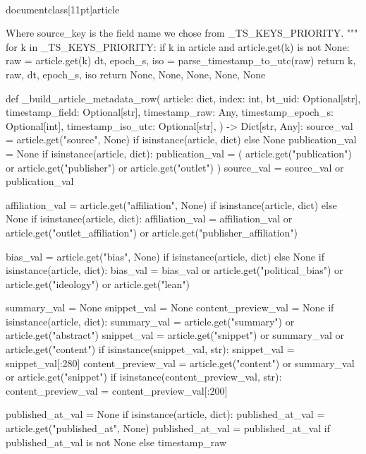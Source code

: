 \\documentclass[11pt]{article}
\begin{document}
\begin{CodeBlock}
    Where source_key is the field name we chose from _TS_KEYS_PRIORITY.
    """
    for k in _TS_KEYS_PRIORITY:
        if k in article and article.get(k) is not None:
            raw = article.get(k)
            dt, epoch_s, iso = parse_timestamp_to_utc(raw)
            return k, raw, dt, epoch_s, iso
    return None, None, None, None, None


def _build_article_metadata_row(
    article: dict,
    index: int,
    bt_uid: Optional[str],
    timestamp_field: Optional[str],
    timestamp_raw: Any,
    timestamp_epoch_s: Optional[int],
    timestamp_iso_utc: Optional[str],
) -> Dict[str, Any]:
    source_val = article.get("source", None) if isinstance(article, dict) else None
    publication_val = None
    if isinstance(article, dict):
        publication_val = (
            article.get("publication")
            or article.get("publisher")
            or article.get("outlet")
        )
        source_val = source_val or publication_val

    affiliation_val = article.get("affiliation", None) if isinstance(article, dict) else None
    if isinstance(article, dict):
        affiliation_val = affiliation_val or article.get("outlet_affiliation") or article.get("publisher_affiliation")

    bias_val = article.get("bias", None) if isinstance(article, dict) else None
    if isinstance(article, dict):
        bias_val = bias_val or article.get("political_bias") or article.get("ideology") or article.get("lean")

    summary_val = None
    snippet_val = None
    content_preview_val = None
    if isinstance(article, dict):
        summary_val = article.get("summary") or article.get("abstract")
        snippet_val = article.get("snippet") or summary_val or article.get("content")
        if isinstance(snippet_val, str):
            snippet_val = snippet_val[:280]
        content_preview_val = article.get("content") or summary_val or article.get("snippet")
        if isinstance(content_preview_val, str):
            content_preview_val = content_preview_val[:200]

    published_at_val = None
    if isinstance(article, dict):
        published_at_val = article.get("published_at", None)
    published_at_val = published_at_val if published_at_val is not None else timestamp_raw


\end{CodeBlock}
\end{document}
